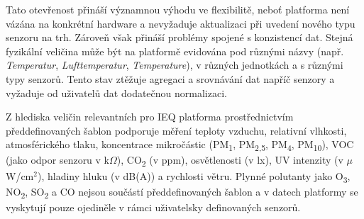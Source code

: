 Tato otevřenost přináší významnou výhodu ve flexibilitě, neboť platforma není vázána na konkrétní hardware a nevyžaduje aktualizaci při uvedení nového typu senzoru na trh. Zároveň však přináší problémy spojené s konzistencí dat. Stejná fyzikální veličina může být na platformě evidována pod různými názvy (např. \textit{Temperatur}, \textit{Lufttemperatur}, \textit{Temperature}), v různých jednotkách a s různými typy senzorů. Tento stav ztěžuje agregaci a srovnávání dat napříč senzory a vyžaduje od uživatelů dat dodatečnou normalizaci. \parencite{SenseboxOpenSenseMapAPI2026}

Z hlediska veličin relevantních pro IEQ platforma prostřednictvím předdefinovaných šablon podporuje měření teploty vzduchu, relativní vlhkosti, atmosférického tlaku, koncentrace mikročástic (PM\textsubscript{1}, PM\textsubscript{2,5}, PM\textsubscript{4}, PM\textsubscript{10}), VOC (jako odpor senzoru v k$\Omega$), CO\textsubscript{2} (v ppm), osvětlenosti (v lx), UV intenzity (v $\mu$W/cm$^2$), hladiny hluku (v dB(A)) a rychlosti větru. Plynné polutanty jako O\textsubscript{3}, NO\textsubscript{2}, SO\textsubscript{2} a CO nejsou součástí předdefinovaných šablon a v datech platformy se vyskytují pouze ojediněle v rámci uživatelsky definovaných senzorů. \parencite{SenseboxOpenSenseMapAPI2026, OpenSenseMapAPIDocumentation}
